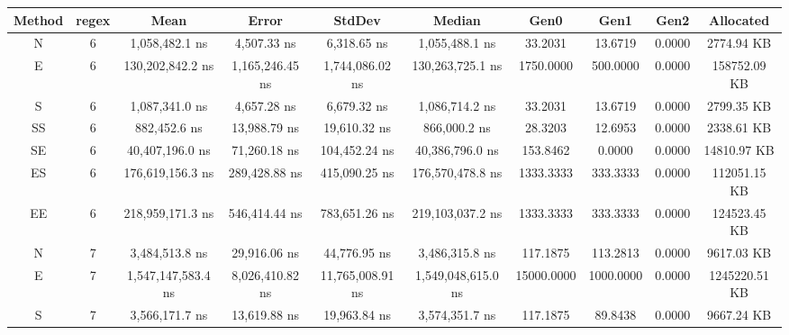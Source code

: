 \begin{sidewaystable}
    \begin{tabular}{|c|c|c|c|c|c|c|c|c|c|}
        \hline
        Method  &   regex   &   Mean                  &   Error             &   StdDev                &   Median                &   Gen0        &   Gen1        &   Gen2        &   Allocated        \\
        \hline
        N       &   6       &   1,058,482.1 ns        &   4,507.33 ns       &   6,318.65 ns           &   1,055,488.1 ns        &   33.2031     &   13.6719     &   0.0000      &   2774.94 KB       \\
        E       &   6       &   130,202,842.2 ns      &   1,165,246.45 ns   &   1,744,086.02 ns       &   130,263,725.1 ns      &   1750.0000   &   500.0000    &   0.0000      &   158752.09 KB     \\
        S       &   6       &   1,087,341.0 ns        &   4,657.28 ns       &   6,679.32 ns           &   1,086,714.2 ns        &   33.2031     &   13.6719     &   0.0000      &   2799.35 KB       \\
        SS      &   6       &   882,452.6 ns          &   13,988.79 ns      &   19,610.32 ns          &   866,000.2 ns          &   28.3203     &   12.6953     &   0.0000      &   2338.61 KB       \\
        SE      &   6       &   40,407,196.0 ns       &   71,260.18 ns      &   104,452.24 ns         &   40,386,796.0 ns       &   153.8462    &   0.0000      &   0.0000      &   14810.97 KB      \\
        ES      &   6       &   176,619,156.3 ns      &   289,428.88 ns     &   415,090.25 ns         &   176,570,478.8 ns      &   1333.3333   &   333.3333    &   0.0000      &   112051.15 KB     \\
        EE      &   6       &   218,959,171.3 ns      &   546,414.44 ns     &   783,651.26 ns         &   219,103,037.2 ns      &   1333.3333   &   333.3333    &   0.0000      &   124523.45 KB     \\
        N       &   7       &   3,484,513.8 ns        &   29,916.06 ns      &   44,776.95 ns          &   3,486,315.8 ns        &   117.1875    &   113.2813    &   0.0000      &   9617.03 KB       \\
        E       &   7       &   1,547,147,583.4 ns    &   8,026,410.82 ns   &   11,765,008.91 ns      &   1,549,048,615.0 ns    &   15000.0000  &   1000.0000   &   0.0000      &   1245220.51 KB    \\
        S       &   7       &   3,566,171.7 ns        &   13,619.88 ns      &   19,963.84 ns          &   3,574,351.7 ns        &   117.1875    &   89.8438     &   0.0000      &   9667.24 KB       \\

\end{tabular}
\end{sidewaystable}
